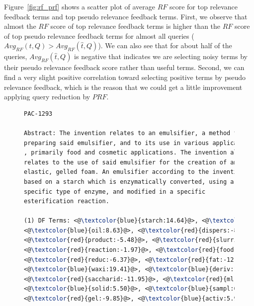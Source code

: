 Figure~\ref{fig:rf_prf} shows a scatter plot of average $\mathit{RF}$ score for top relevance feedback terms and top pseudo relevance feedback terms. First, we observe that almost the $\mathit{RF}$ score of top relevance feedback terms is higher than the $\mathit{RF}$ score of top pseudo relevance feedback terms for almost all queries ($ Avg_{RF}(t, Q) > Avg_{RF}(\hat{t}, Q)$). We can also see that for about half of the queries, $Avg_{RF}(\hat{t}, Q)$ is negative that indicates we are selecting noisy terms by their pseudo relevance feedback score rather than useful terms. Second, we can find a very slight positive correlation toward selecting positive terms by pseudo relevance feedback, which is the reason that we could get a little improvement applying query reduction by $\mathit{PRF}$.  
\begin{figure}[htpb]
\begin{framed}
\vspace*{-2ex}
  \centering
 \begin{lstlisting}[basicstyle=\small\ttfamily , linewidth=\columnwidth,breaklines=true, language=TeX] 
PAC-1293

Abstract: The invention relates to an emulsifier, a method for 
preparing said emulsifier, and to its use in various applications
, primarily food and cosmetic applications. The invention also 
relates to the use of said emulsifier for the creation of an 
elastic, gelled foam. An emulsifier according to the invention is 
based on a starch which is enzymatically converted, using a 
specific type of enzyme, and modified in a specific 
esterification reaction.

(1) DF Terms: <@\textcolor{blue}{starch:14.64}@>, <@\textcolor{blue}{enzym:29.49}@>, <@\textcolor{red}{amylos:-20.15}@>, 
<@\textcolor{blue}{oil:8.63}@>, <@\textcolor{red}{dispers:-8.66}@>, <@\textcolor{red}{ph:-4.55}@>, <@\textcolor{red}{dry:-6.21}@>, <@\textcolor{red}{heat:-2.26}@>, 
<@\textcolor{red}{product:-5.48}@>, <@\textcolor{red}{slurri:-11.48}@>, <@\textcolor{blue}{viscos:7.77}@>, <@\textcolor{red}{composit:-4.49}@>, 
<@\textcolor{red}{reaction:-1.97}@>, <@\textcolor{red}{food:-11.94}@>, <@\textcolor{blue}{agent:5.19}@>, <@\textcolor{red}{debranch:-10.58}@>, 
<@\textcolor{red}{reduc:-6.37}@>, <@\textcolor{red}{fat:-12.83}@>, <@\textcolor{red}{prepar:-0.82}@>, <@\textcolor{red}{hour:-5.42}@>, 
<@\textcolor{blue}{waxi:19.41}@>, <@\textcolor{blue}{deriv:11.97}@>, <@\textcolor{red}{content:-3.38}@>, <@\textcolor{blue}{aqueou:0.38}@>, 
<@\textcolor{red}{saccharid:-11.95}@>, <@\textcolor{red}{ml:-0.79}@>, <@\textcolor{red}{cook:-10.04}@>, <@\textcolor{blue}{modifi:5.65}@>, 
<@\textcolor{blue}{solid:5.50}@>, <@\textcolor{blue}{sampl:6.27}@>, <@\textcolor{blue}{mix:2.48}@>, <@\textcolor{red}{minut:-1.68}@>, <@\textcolor{red}{dri:-0.91}@>, 
<@\textcolor{red}{gel:-9.85}@>, <@\textcolor{blue}{activ:5.98}@>, <@\textcolor{red}{corn:-5.27}@>, <@\textcolor{blue}{alpha:12}@>, <@\textcolor{red}{sprai:-2.74}@> 


\end{lstlisting}
\end{framed}
\end{figure}
